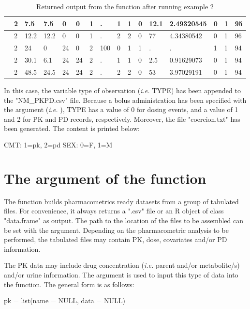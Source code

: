 \begin{table}[!ht]
{\begin{tabular}{|l|l|l|l|l|l|l|l|l|l|l|l|l|l|l|l|}
\midrule
	&2	&7.5	&7.5	&0	&0	&1	&.	&1	&1	&0	&12.1	&2.49320545	&0	&1	&95\\
	\midrule
	&2	&12.2	&12.2	&0	&0	&1	&.	&2	&2	&0&	77	&4.34380542	&0	&1&	96\\
	\midrule
	&2	&24&	0	&24&	0	&2	&100&	0	&1	&1	&.	&.	&1	&1&	94\\
	\midrule
	&2	&30.1&	6.1&	24&	24&	2	&.	&1	&1	&0	&2.5&	0.91629073	&0	&1	&94\\
	\midrule
	&2	&48.5&	24.5&	24	&24&	2	&.	&2	&2	&0	&53	&3.97029191&	0	&1	&94\\
	\bottomrule
\end{tabular}
}
\caption{Returned output from the  function after running example 2 \label{table:ex2}} 
 \end{table}
   
In this case, the variable type of observation (\textit{i.e.} TYPE) has been appended to the "NM\_PKPD.csv" file. Because a bolus administration has been specified with the argument  (\textit{i.e.} ), TYPE has a value of 0 for dosing events, and a value of 1 and 2 for PK and PD records, respectively.  Moreover, the file "coercion.txt" has been generated. The content is printed below:

\begin{example}
CMT: 1=pk, 2=pd
SEX: 0=F, 1=M
\end{example}

\section{The argument of the  function}

The  function builds pharmacometrics ready datasets from a group of tabulated files. For convenience, it always returns a ".csv" file or an R object of class "data.frame" as output. The path to the location of the files to be assembled can be set with the  argument. Depending on the pharmacometric analysis to be performed, the tabulated files may contain PK, dose, covariates and/or PD information. 

The PK data may include drug concentration (\textit{i.e.} parent and/or metabolite/s) and/or urine information. The  argument is used to input this type of data into the  function. The general form is as follows: 
\begin{example}
pk = list(name = NULL, data = NULL) 
\end{example}

